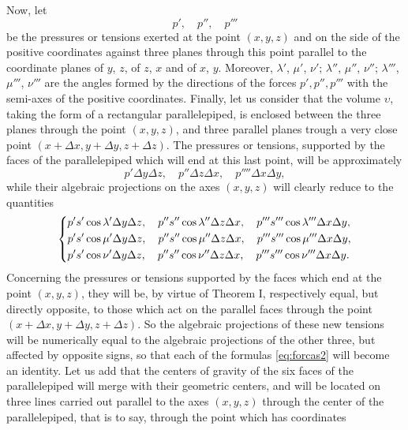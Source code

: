 \documentclass[leqno,openright,smallroyalvopaper,8pt,twoside,showtrims]{memoir}
\begin{document}
Now, let 
\begin{equation}
p',\quad p'',\quad p'''
\end{equation}
be the pressures or tensions exerted at the point $(x,y,z)$ and on the side of the positive coordinates against three planes through this point parallel to the coordinate planes of $y$, $z$, of $z$, $x$ and of $x$, $y$. Moreover, $\lambda'$, $\mu'$, $\nu'$; $\lambda''$, $\mu''$, $\nu''$; $\lambda'''$, $\mu'''$, $\nu'''$ are the angles formed by the directions
of the forces $p', p'',p'''$ with the semi-axes of the positive coordinates. Finally, let us consider that the volume $\upsilon$, taking the form of a rectangular parallelepiped, is enclosed between the three planes through the point $(x, y, z)$, and three parallel planes trough a very close point $(x+\Delta x, y+\Delta y, z+\Delta z)$. The pressures or tensions, supported by the faces of the parallelepiped which will end at this last point, will be approximately
\begin{equation}
p'\Delta y\Delta z,\quad p''\Delta z\Delta x,\quad p''''\Delta x\Delta y,
\end{equation}
while their algebraic projections on the axes $(x,y,z)$ will clearly reduce to the quantities
\begin{equation}
   \begin{dcases}
       p's'\cos\lambda'\Delta y\Delta z,\quad p''s''\cos\lambda''\Delta z\Delta x,\quad p'''s'''\cos\lambda'''\Delta x\Delta y,\\
       p's'\cos\mu'\Delta y\Delta z,\quad p''s''\cos\mu''\Delta z\Delta x,\quad p'''s'''\cos\mu'''\Delta x\Delta y,\\
       p's'\cos\nu'\Delta y\Delta z,\quad p''s''\cos\nu''\Delta z\Delta x,\quad p'''s'''\cos\nu'''\Delta x\Delta y.
   \end{dcases}
 \end{equation}
Concerning the pressures or tensions supported by the faces which end at the point $(x, y, z)$, they will be, by virtue of Theorem I, respectively equal, but directly opposite, to those which act on the parallel faces through the point $(x+\Delta x, y+\Delta y, z+\Delta z)$. So the algebraic projections of these new tensions will be numerically equal to the algebraic projections of the other three, but affected by opposite signs, so that each of the formulas \eqref{eq:forcas2} will become an identity. Let us add that the centers of gravity of the six faces of the parallelepiped will merge with their geometric centers, and will be located on three lines carried out parallel to the axes $(x, y, z)$ through the center of the parallelepiped, that is to say, through the point which has coordinates
\end{document}
